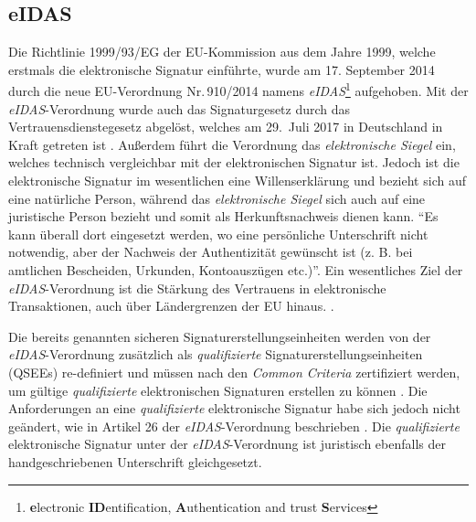 \documentclass[11pt,a4paper,ngerman]{scrreprt}
\begin{document}
\subsection{eIDAS}\label{sec:eidas}
Die Richtlinie 1999/93/EG der EU-Kommission aus dem Jahre 1999, welche erstmals die elektronische Signatur einführte, wurde am 17. September 2014 durch die neue EU-Verordnung Nr.\,910/2014 namens \textit{eIDAS}\footnote{\textbf{e}lectronic \textbf{ID}entification, \textbf{A}uthentication and trust \textbf{S}ervices} aufgehoben. Mit der \emph{eIDAS}-Verordnung wurde auch das Signaturgesetz durch das Vertrauensdienstegesetz abgelöst, welches am 29.~Juli 2017 in Deutschland in Kraft getreten ist \cite{eIDASDurchführung}. Außerdem führt die Verordnung das \textit{elektronische Siegel} ein, welches technisch vergleichbar mit der elektronischen Signatur ist. Jedoch ist die elektronische Signatur im wesentlichen eine Willenserklärung und bezieht sich auf eine natürliche Person, während das \textit{elektronische Siegel} sich auch auf eine juristische Person bezieht und somit als Herkunftsnachweis dienen kann. ``Es kann überall dort eingesetzt werden, wo eine persönliche Unterschrift nicht notwendig, aber der Nachweis der Authentizität gewünscht ist (z. B. bei amtlichen Bescheiden, Urkunden, Kontoauszügen etc.)''\cite{eu910/2014Website}. Ein wesentliches Ziel der \textit{eIDAS}-Verordnung ist die Stärkung des Vertrauens in elektronische Transaktionen, auch über Ländergrenzen der EU hinaus. \cite{eu910/2014}.

Die bereits genannten sicheren Signaturerstellungseinheiten werden von der \textit{eIDAS}-Verordnung zusätzlich als \emph{qualifizierte} Signaturerstellungseinheiten (QSEEs) re-definiert und müssen nach den \textit{Common Criteria} zertifiziert werden, um gültige \emph{qualifizierte} elektronischen Signaturen erstellen zu können \cite{sscdCC}. Die Anforderungen an eine \emph{qualifizierte} elektronische Signatur habe sich jedoch nicht geändert, wie in Artikel 26 der \textit{eIDAS}-Verordnung beschrieben \cite[Article 26]{eidasWebsite}. Die \emph{qualifizierte} elektronische Signatur unter der \textit{eIDAS}-Verordnung ist juristisch ebenfalls der handgeschriebenen Unterschrift gleichgesetzt.
\end{document}
